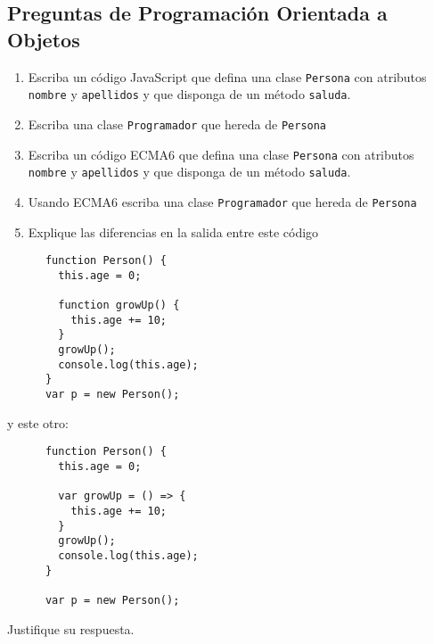 \subsection{Preguntas de Programación Orientada a
Objetos}\label{preguntas-de-programaciuxf3n-orientada-a-objetos}

\begin{enumerate}
\def\labelenumi{\arabic{enumi}.}
\item
  Escriba un código JavaScript que defina una clase \texttt{Persona} con
  atributos \texttt{nombre} y \texttt{apellidos} y que disponga de un
  método \texttt{saluda}.
\item
  Escriba una clase \texttt{Programador} que hereda de \texttt{Persona}
\item
  Escriba un código ECMA6 que defina una clase \texttt{Persona} con
  atributos \texttt{nombre} y \texttt{apellidos} y que disponga de un
  método \texttt{saluda}.
\item
  Usando ECMA6 escriba una clase \texttt{Programador} que hereda de
  \texttt{Persona}
\item
  Explique las diferencias en la salida entre este código
\end{enumerate}

\begin{verbatim}
      function Person() {
        this.age = 0;

        function growUp() {
          this.age += 10;
        }
        growUp();
        console.log(this.age);
      }
      var p = new Person();
\end{verbatim}

y este otro:

\begin{verbatim}
      function Person() {
        this.age = 0;

        var growUp = () => {
          this.age += 10;
        }
        growUp();
        console.log(this.age);
      }

      var p = new Person();
\end{verbatim}

Justifique su respuesta.

